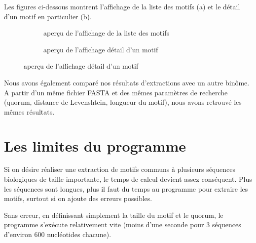 \documentclass[a4paper,12pt]{article}
\begin{document}
Les figures ci-dessous montrent l'affichage de la liste des motifs (a) et le détail d'un motif en particulier (b).
\begin{figure}[h!]
\begin{subfigure}{.5\textwidth}
  \centering
  \caption{aperçu de l'affichage de la liste des motifs}
  \label{fig:sfig1}
\end{subfigure}%
\begin{subfigure}{.5\textwidth}
  \centering
  \caption{aperçu de l'affichage détail d'un motif}
  \label{fig:sfig2}
\end{subfigure}%
\end{figure}
Nous avons également comparé nos résultats d'extractions avec un autre binôme. A partir d'un même fichier FASTA et des mêmes paramètres de recherche (quorum, distance de Levenshtein, longueur du motif), nous avons retrouvé les mêmes résultats. 

\section{Les limites du programme} 

Si on désire réaliser une extraction de motifs communs à plusieurs séquences biologiques de taille importante, le temps de calcul devient assez conséquent. Plus les séquences sont longues, plus il faut du temps au programme pour extraire les motifs, surtout si on ajoute des erreurs possibles. 

Sans erreur, en définissant simplement la taille du motif et le quorum, le programme s’exécute relativement vite (moins d'une seconde pour 3 séquences d'environ 600 nucléotides chacune).
\end{document}
